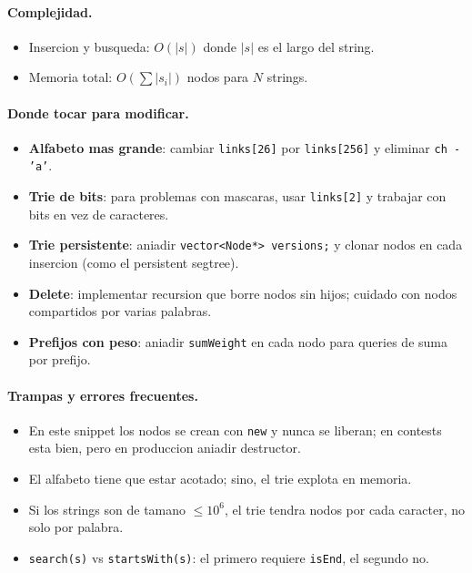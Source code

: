 \paragraph{Complejidad.}
\begin{itemize}\setlength\itemsep{0pt}
	\item Insercion y busqueda: $O(|s|)$ donde $|s|$ es el largo del string.
	\item Memoria total: $O(\sum |s_i|)$ nodos para $N$ strings.
\end{itemize}

\paragraph{Donde tocar para modificar.}
\begin{itemize}\setlength\itemsep{0pt}
	\item \textbf{Alfabeto mas grande}: cambiar \texttt{links[26]} por \texttt{links[256]} y eliminar \texttt{ch - 'a'}.
	\item \textbf{Trie de bits}: para problemas con mascaras, usar \texttt{links[2]} y trabajar con bits en vez de caracteres.
	\item \textbf{Trie persistente}: aniadir \texttt{vector<Node*> versions;} y clonar nodos en cada insercion (como el persistent segtree).
	\item \textbf{Delete}: implementar recursion que borre nodos sin hijos; cuidado con nodos compartidos por varias palabras.
	\item \textbf{Prefijos con peso}: aniadir \texttt{sumWeight} en cada nodo para queries de suma por prefijo.
\end{itemize}

\paragraph{Trampas y errores frecuentes.}
\begin{itemize}\setlength\itemsep{0pt}
	\item En este snippet los nodos se crean con \texttt{new} y nunca se liberan; en contests esta bien, pero en produccion aniadir destructor.
	\item El alfabeto tiene que estar acotado; sino, el trie explota en memoria.
	\item Si los strings son de tamano $\le 10^6$, el trie tendra nodos por cada caracter, no solo por palabra.
	\item \texttt{search(s)} vs \texttt{startsWith(s)}: el primero requiere \texttt{isEnd}, el segundo no.
\end{itemize}

